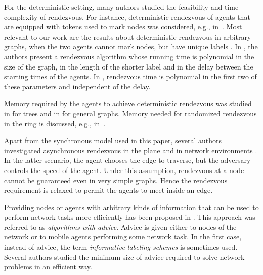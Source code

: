 \documentclass{llncs}
\begin{document}
For the deterministic setting, many authors studied the feasibility and time complexity of rendezvous. For instance, deterministic rendezvous of agents that are equipped with tokens used to mark nodes was considered, e.g., in~\cite{KKSS}. Most relevant to our work are the results about 
deterministic rendezvous in arbitrary graphs, when the two agents cannot mark nodes, but have unique labels  \cite{DFKP,KM,TSZ07}.
In \cite{DFKP}, the authors present a rendezvous algorithm whose running time is polynomial in the size of the graph, in the length of the shorter
label and in the delay between the starting times of the agents. In \cite{KM,TSZ07}, rendezvous time is polynomial in the first two of these parameters and independent of the delay.

Memory required by the agents to achieve deterministic rendezvous was studied in \cite{FP2} for trees and in  \cite{CKP} for general graphs.
Memory needed for randomized rendezvous in the ring is discussed, e.g., in~\cite{KKPM08}. 

Apart from the synchronous model used in this paper, several authors investigated asynchronous rendezvous in the plane \cite{CFPS,fpsw} and in network environments
\cite{BCGIL,CLP,DGKKP,DPV}.
In the latter scenario, the agent chooses the edge to traverse, but the adversary controls the speed of the agent. Under this assumption, rendezvous
at a node cannot be guaranteed even in very simple graphs. Hence the rendezvous requirement is relaxed to permit the agents to meet inside an edge.

Providing nodes or agents with arbitrary kinds of information that can be used to perform network tasks more efficiently has been
proposed in \cite{AKM01,CFP,CFIKP,DP,EFKR,FGIP,FIP1,FIP2,FKL,FP,FPR,GPPR02,IKP,KKKP02,KKP05,SN,TZ05}. This approach was referred to as
{\em algorithms with advice}.  
Advice is given either to nodes of the network or to mobile agents performing some network task.
In the first case, instead of advice, the term {\em informative labeling schemes} is sometimes used.
Several authors studied the minimum size of advice required to solve
network problems in an efficient way. 
\end{document}
